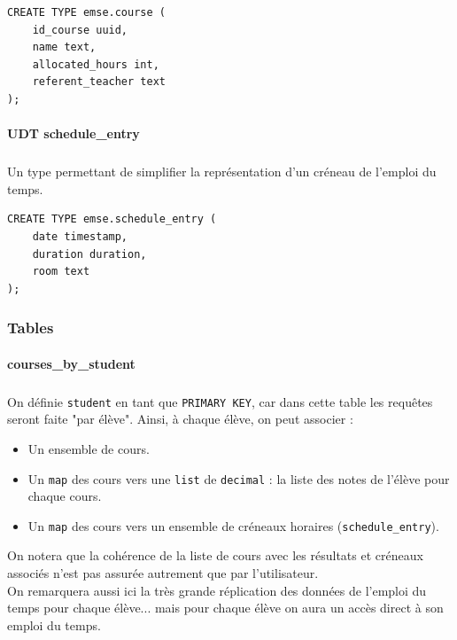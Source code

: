 \documentclass[a4paper, 11pt]{article}
\begin{document}
\begin{tcolorbox}
\begin{lstlisting}
CREATE TYPE emse.course (
    id_course uuid,
    name text,
    allocated_hours int,
    referent_teacher text
);

\end{lstlisting}
\end{tcolorbox}

\paragraph{UDT schedule\_entry}
\subparagraph{}
Un type permettant de simplifier la représentation d'un créneau de l'emploi du temps.

\begin{tcolorbox}
\begin{lstlisting}
CREATE TYPE emse.schedule_entry (
    date timestamp,
    duration duration,
    room text
);
\end{lstlisting}
\end{tcolorbox}

\subsubsection{Tables}

\paragraph{courses\_by\_student}

\subparagraph{}
On définie \texttt{student} en tant que \texttt{PRIMARY KEY}, car dans cette table les requêtes seront faite "par élève".
Ainsi, à chaque élève, on peut associer :
\begin{itemize}
\item Un ensemble de cours.
\item Un \texttt{map} des cours vers une \texttt{list} de \texttt{decimal} : la liste des notes de l'élève pour chaque cours.
\item Un \texttt{map} des cours vers un ensemble de créneaux horaires (\texttt{schedule\_entry}).
\end{itemize}
On notera que la cohérence de la liste de cours avec les résultats et créneaux associés n'est pas assurée autrement que par l'utilisateur.\\
On remarquera aussi ici la très grande réplication des données de l'emploi du temps pour chaque élève... mais pour chaque élève on aura un accès direct à son emploi du temps.
\end{document}
